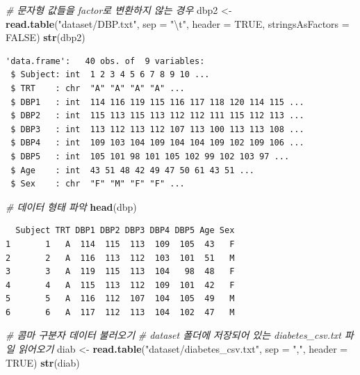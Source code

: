 \documentclass[
  11pt,
]{krantz}
\newenvironment{Shaded}{\begin{snugshade}}{\end{snugshade}}
\newcommand{\CharTok}[1]{\textcolor[rgb]{0.5,0.5,0.5}{#1}}
\newcommand{\CommentTok}[1]{\textcolor[rgb]{0.37,0.37,0.37}{\textit{#1}}}
\newcommand{\DataTypeTok}[1]{\textcolor[rgb]{0.27,0.27,0.27}{#1}}
\newcommand{\KeywordTok}[1]{\textcolor[rgb]{0.27,0.27,0.27}{\textbf{#1}}}
\newcommand{\NormalTok}[1]{#1}
\newcommand{\OtherTok}[1]{\textcolor[rgb]{0.37,0.37,0.37}{#1}}
\newcommand{\StringTok}[1]{\textcolor[rgb]{0.5,0.5,0.5}{#1}}
\begin{document}
\begin{Shaded}
\begin{Highlighting}[]
\CommentTok{# 문자형 값들을 factor로 변환하지 않는 경우}
\NormalTok{dbp2 <-}\StringTok{ }\KeywordTok{read.table}\NormalTok{(}\StringTok{"dataset/DBP.txt"}\NormalTok{, }\DataTypeTok{sep =} \StringTok{"}\CharTok{\textbackslash{}t}\StringTok{"}\NormalTok{, }
                   \DataTypeTok{header =} \OtherTok{TRUE}\NormalTok{, }
                   \DataTypeTok{stringsAsFactors =} \OtherTok{FALSE}\NormalTok{)}
\KeywordTok{str}\NormalTok{(dbp2)}
\end{Highlighting}
\end{Shaded}

\begin{verbatim}
'data.frame':   40 obs. of  9 variables:
 $ Subject: int  1 2 3 4 5 6 7 8 9 10 ...
 $ TRT    : chr  "A" "A" "A" "A" ...
 $ DBP1   : int  114 116 119 115 116 117 118 120 114 115 ...
 $ DBP2   : int  115 113 115 113 112 112 111 115 112 113 ...
 $ DBP3   : int  113 112 113 112 107 113 100 113 113 108 ...
 $ DBP4   : int  109 103 104 109 104 104 109 102 109 106 ...
 $ DBP5   : int  105 101 98 101 105 102 99 102 103 97 ...
 $ Age    : int  43 51 48 42 49 47 50 61 43 51 ...
 $ Sex    : chr  "F" "M" "F" "F" ...
\end{verbatim}

\begin{Shaded}
\begin{Highlighting}[]
\CommentTok{# 데이터 형태 파악}
\KeywordTok{head}\NormalTok{(dbp)}
\end{Highlighting}
\end{Shaded}

\begin{verbatim}
  Subject TRT DBP1 DBP2 DBP3 DBP4 DBP5 Age Sex
1       1   A  114  115  113  109  105  43   F
2       2   A  116  113  112  103  101  51   M
3       3   A  119  115  113  104   98  48   F
4       4   A  115  113  112  109  101  42   F
5       5   A  116  112  107  104  105  49   M
6       6   A  117  112  113  104  102  47   M
\end{verbatim}

\begin{Shaded}
\begin{Highlighting}[]
\CommentTok{# 콤마 구분자 데이터 불러오기}
\CommentTok{# dataset 폴더에 저장되어 있는 diabetes_csv.txt 파일 읽어오기}
\NormalTok{diab <-}\StringTok{ }\KeywordTok{read.table}\NormalTok{(}\StringTok{"dataset/diabetes_csv.txt"}\NormalTok{, }\DataTypeTok{sep =} \StringTok{","}\NormalTok{, }\DataTypeTok{header =} \OtherTok{TRUE}\NormalTok{)}
\KeywordTok{str}\NormalTok{(diab)}
\end{Highlighting}
\end{Shaded}
\end{document}
